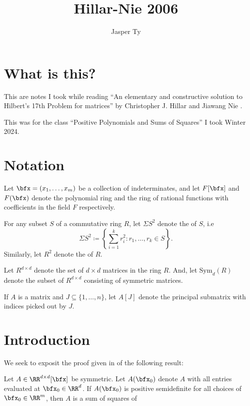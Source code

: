 \documentclass{article}
\title{Hillar-Nie 2006}
\author{Jasper Ty}
\date{}
\newcommand*\Sym{\mathrm{Sym}}
\begin{document}
\maketitle

\section*{What is this?}

This are notes I took while reading ``An elementary and constructive solution to Hilbert's 17th Problem for matrices'' by Christopher J. Hillar and Jiawang Nie \cite{HN06}.

This was for the class ``Positive Polynomials and Sums of Squares'' I took Winter 2024.

\tableofcontents

\section*{Notation}

Let $\bfx = (x_1,\ldots,x_m)$ be a collection of indeterminates, and let $F[\bfx]$ and $F(\bfx)$ denote the polynomial ring and the ring of rational functions with coefficients in the field $F$ respectively.

For any subset $S$ of a commutative ring $R$, let $\Sigma S^2$ denote the  of $S$, i.e
\[
    \Sigma S^2
    \coloneq
    \left\{
        \sum_{i=1}^k r_i^2: r_1,\ldots,r_k \in S
    \right\}.
\]
Similarly, let $R^2$ denote the  of $R$.

Let $R^{d \times d}$ denote the set of $d \times d$ matrices in the ring $R$. And, let $\Sym_d(R)$ denote the subset of $R^{d \times d}$ consisting of symmetric matrices.

If $A$ is a matrix and $J \subseteq \{1,\ldots,n\}$, let $A[J]$ denote the principal submatrix with indices picked out by $J$.

\section{Introduction}

We seek to exposit the proof given in \cite{HN06} of the following result:

\begin{theorem}
    \label{thm:1} 
    Let $A \in \RR^{d \times d}[\bfx]$ be symmetric.
    Let $A(\bfx_0)$ denote $A$ with all entries evaluated at $\bfx_0 \in \RR^d$.
    If $A(\bfx_0)$ is positive semidefinite for all choices of $\bfx_0 \in \RR^m$, then $A$ is a sum of squares of 
\end{theorem}
\end{document}
